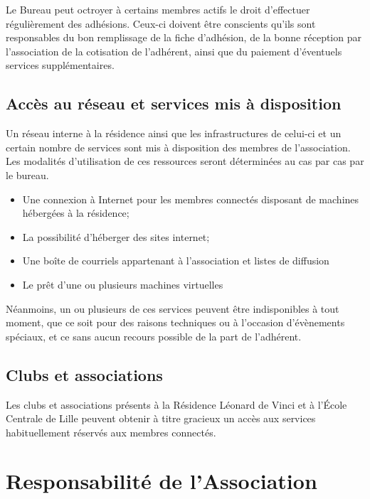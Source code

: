 \documentclass[12pt]{article}
\begin{document}
		Le Bureau peut octroyer à certains membres actifs le droit d’effectuer régulièrement des adhésions. Ceux-ci doivent être conscients qu’ils sont responsables du bon remplissage de la fiche d’adhésion, de la bonne réception par l’association de la cotisation de l’adhérent, ainsi que du paiement d’éventuels services supplémentaires.

    \subsection{Accès au réseau et services mis à disposition}

		Un réseau interne à la résidence ainsi que les infrastructures de celui-ci et un certain nombre de services sont mis à disposition des membres de l'association. Les modalités d'utilisation de ces ressources seront déterminées au cas par cas par le bureau.

		\begin{itemize}
			\item[\textbullet] Une connexion à Internet pour les membres connectés disposant de machines hébergées à la résidence;
			\item[\textbullet] La possibilité d'héberger des sites internet;
			\item[\textbullet] Une boîte de courriels appartenant à l'association et listes de diffusion
			\item[\textbullet] Le prêt d'une ou plusieurs machines virtuelles
		\end{itemize}

		Néanmoins, un ou plusieurs de ces services peuvent être indisponibles à tout moment, que ce soit pour des raisons techniques ou à l'occasion d'évènements spéciaux, et ce sans aucun recours possible de la part de l'adhérent.

    \subsection{Clubs et associations}

		Les clubs et associations présents à la Résidence Léonard de Vinci et à l'École Centrale de Lille peuvent obtenir à titre gracieux un accès aux services habituellement réservés aux membres connectés.

\section{Responsabilité de l'Association}
\end{document}
